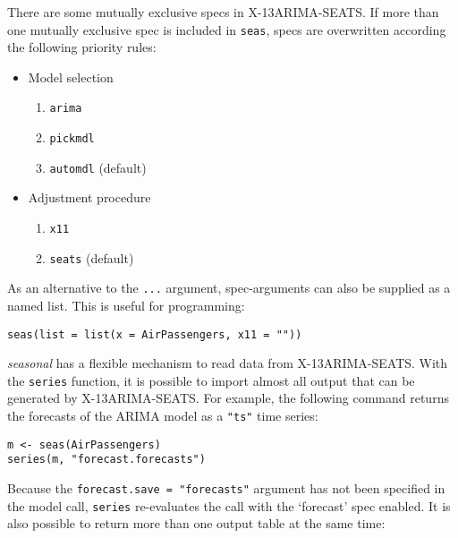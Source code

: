 There are some mutually exclusive specs in X-13ARIMA-SEATS. If more than
one mutually exclusive spec is included in \texttt{seas}, specs are
overwritten according the following priority rules:

\begin{itemize}
\itemsep1pt\parskip0pt
\item
  Model selection

  \begin{enumerate}
  \def\labelenumi{\arabic{enumi}.}
  \itemsep1pt\parskip0pt
  \item
    \texttt{arima}
  \item
    \texttt{pickmdl}
  \item
    \texttt{automdl} (default)
  \end{enumerate}
\item
  Adjustment procedure

  \begin{enumerate}
  \def\labelenumi{\arabic{enumi}.}
  \itemsep1pt\parskip0pt
  \item
    \texttt{x11}
  \item
    \texttt{seats} (default)
  \end{enumerate}
\end{itemize}

As an alternative to the \texttt{...} argument, spec-arguments can also
be supplied as a named list. This is useful for programming:

\begin{verbatim}
seas(list = list(x = AirPassengers, x11 = ""))
\end{verbatim}


\emph{seasonal} has a flexible mechanism to read data from
X-13ARIMA-SEATS. With the \texttt{series} function, it is possible to
import almost all output that can be generated by X-13ARIMA-SEATS. For
example, the following command returns the forecasts of the ARIMA model
as a \texttt{"ts"} time series:

\begin{verbatim}
m <- seas(AirPassengers)
series(m, "forecast.forecasts")
\end{verbatim}

Because the \texttt{forecast.save\ =\ "forecasts"} argument has not been
specified in the model call, \texttt{series} re-evaluates the call with
the `forecast' spec enabled. It is also possible to return more than one
output table at the same time:

